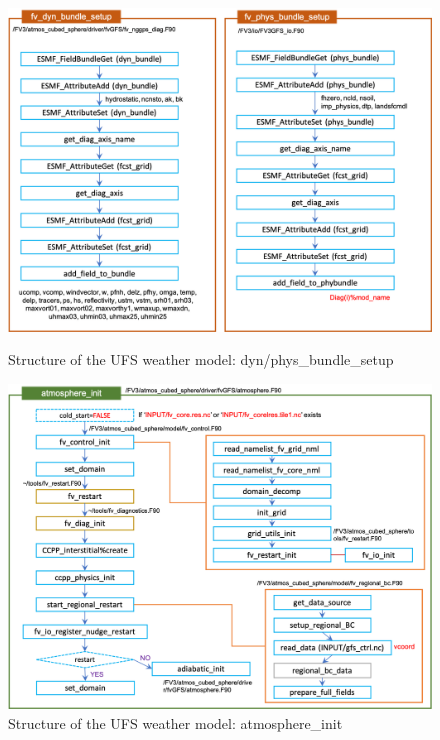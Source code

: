 \documentclass[11pt,fleqn]{report}              %
\begin{document}
\begin{figure}[ht!]
  \centering
  \includegraphics[width=0.73\linewidth]{fv3_struct_bundlesetup.png}
  \caption{Structure of the UFS weather model: dyn/phys\_bundle\_setup}
  \label{fig:fv_struct_bundle_setup}

\vspace{0.1cm}

  \includegraphics[width=0.73\linewidth]{fv3_struct_atmosphereinit.png}
  \caption{Structure of the UFS weather model: atmosphere\_init}
  \label{fig:fv_struct_atmosphere_init}
\end{figure}
\end{document}
